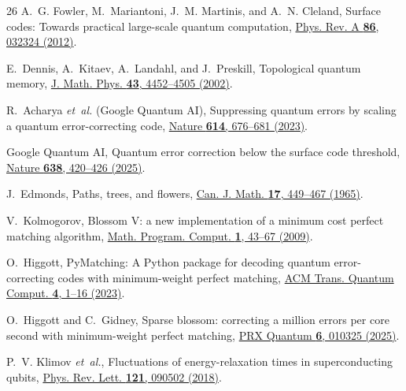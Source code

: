 \documentclass[aps,prxquantum,reprint,superscriptaddress,floatfix,nofootinbib]{revtex4-2}
\begin{document}

\begin{thebibliography}{26}
A.~G. Fowler, M.~Mariantoni, J.~M. Martinis, and A.~N. Cleland,
\newblock Surface codes: Towards practical large-scale quantum computation,
\newblock \href{https://doi.org/10.1103/PhysRevA.86.032324}{Phys. Rev. A \textbf{86}, 032324 (2012)}.

E.~Dennis, A.~Kitaev, A.~Landahl, and J.~Preskill,
\newblock Topological quantum memory,
\newblock \href{https://doi.org/10.1063/1.1499754}{J. Math. Phys. \textbf{43}, 4452--4505 (2002)}.

R.~Acharya \textit{et~al.} (Google Quantum AI),
\newblock Suppressing quantum errors by scaling a quantum error-correcting code,
\newblock \href{https://doi.org/10.1038/s41586-022-05434-1}{Nature \textbf{614}, 676--681 (2023)}.

Google Quantum AI,
\newblock Quantum error correction below the surface code threshold,
\newblock \href{https://doi.org/10.1038/s41586-024-08142-2}{Nature \textbf{638}, 420--426 (2025)}.

J.~Edmonds,
\newblock Paths, trees, and flowers,
\newblock \href{https://doi.org/10.4153/CJM-1965-045-4}{Can. J. Math. \textbf{17}, 449--467 (1965)}.

V.~Kolmogorov,
\newblock Blossom V: a new implementation of a minimum cost perfect matching algorithm,
\newblock \href{https://doi.org/10.1007/s12532-009-0002-8}{Math. Program. Comput. \textbf{1}, 43--67 (2009)}.

O.~Higgott,
\newblock PyMatching: A Python package for decoding quantum error-correcting codes with minimum-weight perfect matching,
\newblock \href{https://doi.org/10.1145/3604932}{ACM Trans. Quantum Comput. \textbf{4}, 1--16 (2023)}.

O.~Higgott and C.~Gidney,
\newblock Sparse blossom: correcting a million errors per core second with minimum-weight perfect matching,
\newblock \href{https://doi.org/10.1103/PRXQuantum.6.010325}{PRX Quantum \textbf{6}, 010325 (2025)}.

P.~V. Klimov \textit{et~al.},
\newblock Fluctuations of energy-relaxation times in superconducting qubits,
\newblock \href{https://doi.org/10.1103/PhysRevLett.121.090502}{Phys. Rev. Lett. \textbf{121}, 090502 (2018)}.


\end{thebibliography}
\end{document}
